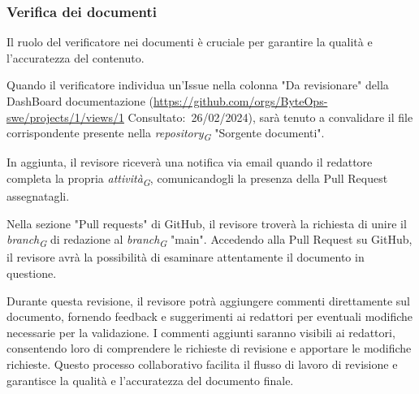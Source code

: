 \subsubsection{Verifica dei documenti}
\label{sec:verificatori}

Il ruolo del verificatore nei documenti è cruciale per garantire la qualità e l'accuratezza del contenuto. 

Quando il verificatore individua un'Issue nella colonna "Da revisionare" della  DashBoard documentazione (\url{https://github.com/orgs/ByteOps-swe/projects/1/views/1} Consultato:~26/02/2024), sarà tenuto a convalidare il file corrispondente presente nella \textit{repository}\textsubscript{\textit{G}} "Sorgente documenti".

In aggiunta, il revisore riceverà una notifica via email quando il redattore completa la propria \textit{attività}\textsubscript{\textit{G}}, comunicandogli la presenza della Pull Request assegnatagli.

Nella sezione "Pull requests" di GitHub, il revisore troverà la richiesta di unire il \textit{branch}\textsubscript{\textit{G}} di redazione al \textit{branch}\textsubscript{\textit{G}} "main". Accedendo alla Pull Request su GitHub, il revisore avrà la possibilità di esaminare attentamente il documento in questione.

Durante questa revisione, il revisore potrà aggiungere commenti direttamente sul documento, fornendo feedback e suggerimenti ai redattori per eventuali modifiche necessarie per la validazione. I commenti aggiunti saranno visibili ai redattori, consentendo loro di comprendere le richieste di revisione e apportare le modifiche richieste. Questo processo collaborativo facilita il flusso di lavoro di revisione e garantisce la qualità e l'accuratezza del documento finale.

\vspace{0.3cm}

